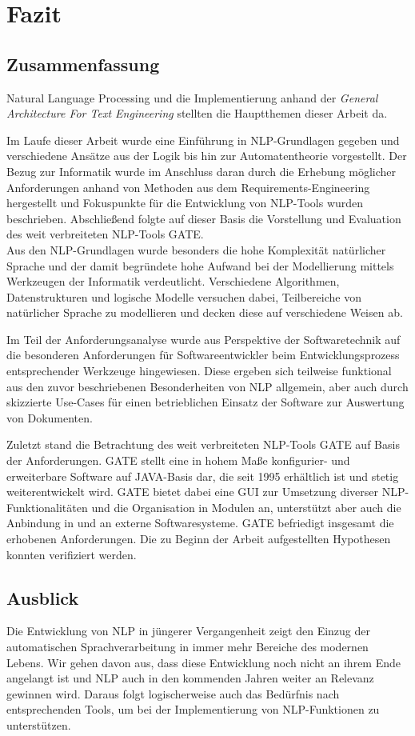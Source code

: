 \documentclass[12pt]{report}
\begin{document}
\chapter{Fazit}
\section{Zusammenfassung}
Natural Language Processing und die Implementierung anhand der \textit{General Architecture For Text Engineering} stellten die Hauptthemen dieser Arbeit da.

Im Laufe dieser Arbeit wurde eine Einführung in NLP-Grundlagen gegeben und verschiedene Ansätze aus der Logik bis hin zur Automatentheorie vorgestellt. Der Bezug zur Informatik wurde im Anschluss daran durch die Erhebung möglicher Anforderungen anhand von Methoden aus dem Requirements-Engineering hergestellt und Fokuspunkte für die Entwicklung von NLP-Tools wurden beschrieben. Abschließend folgte auf dieser Basis die Vorstellung und Evaluation des weit verbreiteten NLP-Tools GATE. \\

Aus den NLP-Grundlagen wurde besonders die hohe Komplexität natürlicher Sprache und der damit begründete hohe Aufwand bei der Modellierung mittels Werkzeugen der Informatik verdeutlicht. Verschiedene Algorithmen, Datenstrukturen und logische Modelle versuchen dabei, Teilbereiche von natürlicher Sprache zu modellieren und decken diese auf verschiedene Weisen ab.

Im Teil der Anforderungsanalyse wurde aus Perspektive der Softwaretechnik auf die besonderen Anforderungen für Softwareentwickler beim Entwicklungsprozess entsprechender Werkzeuge hingewiesen. Diese ergeben sich teilweise funktional aus den zuvor beschriebenen Besonderheiten von NLP allgemein, aber auch durch skizzierte Use-Cases für einen betrieblichen Einsatz der Software zur Auswertung von Dokumenten.

Zuletzt stand die Betrachtung des weit verbreiteten NLP-Tools GATE auf Basis der Anforderungen. GATE stellt eine in hohem Maße konfigurier- und erweiterbare Software auf JAVA-Basis dar, die seit 1995 erhältlich ist und stetig weiterentwickelt wird. GATE bietet dabei eine GUI zur Umsetzung diverser NLP-Funktionalitäten und die Organisation in Modulen an, unterstützt aber auch die Anbindung in und an externe Softwaresysteme. GATE befriedigt insgesamt die erhobenen Anforderungen. Die zu Beginn der Arbeit aufgestellten Hypothesen konnten verifiziert werden.

\section{Ausblick}
Die Entwicklung von NLP in jüngerer Vergangenheit zeigt den Einzug der automatischen Sprachverarbeitung in immer mehr Bereiche des modernen Lebens. Wir gehen davon aus, dass diese Entwicklung noch nicht an ihrem Ende angelangt ist und NLP auch in den kommenden Jahren weiter an Relevanz gewinnen wird. Daraus folgt logischerweise auch das Bedürfnis nach entsprechenden Tools, um bei der Implementierung von NLP-Funktionen zu unterstützen.\\
\end{document}
